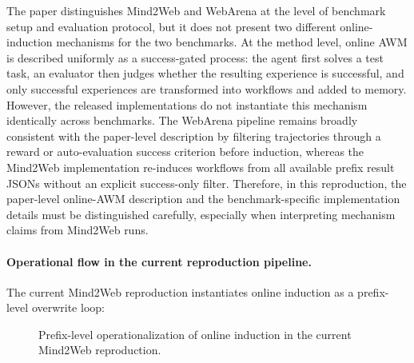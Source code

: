 \documentclass{article}
\begin{document}
The paper distinguishes Mind2Web and WebArena at the level of benchmark
setup and evaluation protocol, but it does not present two different
online-induction mechanisms for the two benchmarks. At the method level,
online AWM is described uniformly as a success-gated process: the agent
first solves a test task, an evaluator then judges whether the resulting
experience is successful, and only successful experiences are
transformed into workflows and added to memory. However, the released
implementations do not instantiate this mechanism identically across
benchmarks. The WebArena pipeline remains broadly consistent with the
paper-level description by filtering trajectories through a reward or
auto-evaluation success criterion before induction, whereas the
Mind2Web implementation re-induces workflows from all available prefix
result JSONs without an explicit success-only filter. Therefore, in this
reproduction, the paper-level online-AWM description and the
benchmark-specific implementation details must be distinguished
carefully, especially when interpreting mechanism claims from Mind2Web
runs.

\paragraph{Operational flow in the current reproduction pipeline.}
The current Mind2Web reproduction instantiates online induction as a
prefix-level overwrite loop:

\begin{figure}[htbp]
\centering
{}
\caption{Prefix-level operationalization of online induction in the current Mind2Web reproduction.}
\label{fig:online-induction-prefix-loop}
\end{figure}
\end{document}
